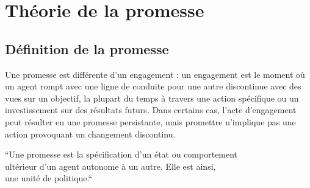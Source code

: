 
\appendix


\chapter{Théorie de la promesse}
\label{appendix:promise_theory}

\section{Définition de la promesse}

Une promesse est différente d'un engagement : un engagement est le moment où un
agent rompt avec une ligne de conduite pour une autre discontinue avec des vues
sur un objectif, la plupart du temps à travers une action spécifique ou un
investissement sur des résultats futurs. Dans certains cas, l'acte
d'engagement peut résulter en une promesse persistante, mais promettre
n'implique pas une action provoquant un changement discontinu.

        ``Une promesse est la spécification d'un état ou comportement \\
        ultérieur d'un agent autonome à un autre. Elle est ainsi, \\
        une unité de politique.`` \cite{burgess_modeling_2006} \\

